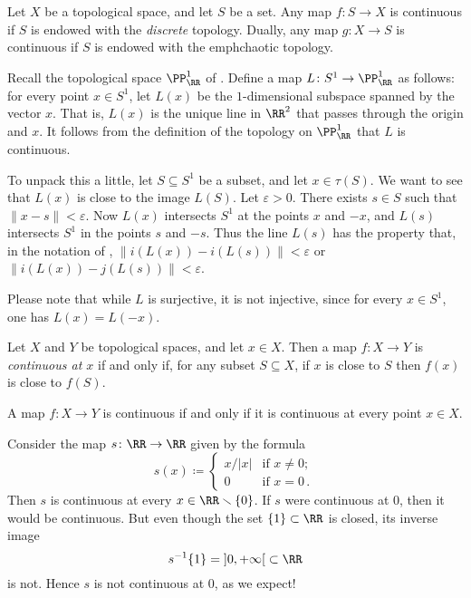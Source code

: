 \begin{exm}
	Let $X$ be a topological space, and let $S$ be a set.
	Any map $f \colon S \to X$ is continuous if $S$ is endowed with the \emph{discrete} topology.
	Dually, any map $ g \colon X \to S $ is continuous if $S$ is endowed with the emph{chaotic} topology.
\end{exm}

\begin{exm}
	Recall the topological space $\PP^1_{\RR}$ of .
	Define a map $ L \colon S^1 \to \PP^1_{\RR}$ as follows: for every point $x \in S^1$, let $L(x)$ be the $1$-dimensional subspace spanned by the vector $x$.
	That is, $L(x)$ is the unique line in $\RR^2$ that passes through the origin and $x$.
	It follows from the definition of the topology on $\PP^1_{\RR}$ that $L$ is continuous.

	To unpack this a little, let $S \subseteq S^1$ be a subset, and let $x \in \tau(S)$.
	We want to see that $L(x)$ is close to the image $L(S)$.
	Let $\varepsilon>0$.
	There exists $ s \in S$ such that $\|x-s\| < \varepsilon$.
	Now $L(x)$ intersects $S^1$ at the points $x$ and $-x$, and $L(s)$ intersects $S^1$ in the points $s$ and $-s$.
	Thus the line $L(s)$ has the property that, in the notation of , $\|i(L(x))-i(L(s))\| < \varepsilon$ or $\|i(L(x))-j(L(s))\| < \varepsilon$.

	Please note that while $L$ is surjective, it is not injective, since for every $x \in S^1$, one has $L(x) = L(-x)$.
\end{exm}

\begin{dfn}
	Let $X$ and $Y$ be topological spaces, and let $x \in X$.
	Then a map $ f \colon X \to Y $ is \emph{continuous at $x$} if and only if, for any subset $S \subseteq X$, if $x $ is close to $S$ then $f(x)$ is close to $f(S)$.
\end{dfn}

A map $ f \colon X \to Y $ is continuous if and only if it is continuous at every point $ x \in X $.
\begin{exm}
	Consider the map $ s \colon \RR \to \RR $ given by the formula
	\[
		s(x) \coloneq \begin{cases}
			x/|x| & \text{if } x \neq 0 \semicolon \\
			0 & \text{if } x=0 \period
		\end{cases}
	\]
	Then $s$ is continuous at every $ x \in \RR \smallsetminus \{0\}$.
	If $s$ were continuous at $0$, then it would be continuous.
	But even though the set $\{1\} \subset \RR$ is closed, its inverse image
	\[
		s^{-1}\{1\} = \left]0, +\infty \right[ \subset \RR
	\]
	is not.
	Hence $s$ is not continuous at $0$, as we expect!
\end{exm}

